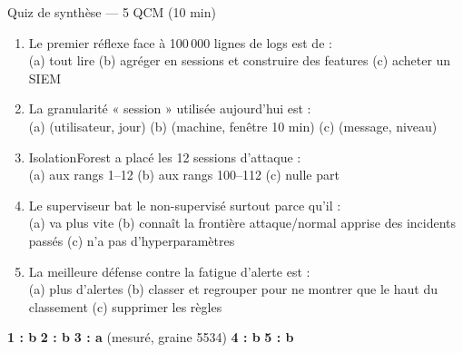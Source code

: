 \begin{frame}{Quiz de synthèse --- 5 QCM (10 min)}
\begin{qbox}
\begin{enumerate}
\item Le premier réflexe face à 100\,000 lignes de logs est de :\\
(a) tout lire \quad (b) agréger en sessions et construire des features \quad
(c) acheter un SIEM
\item La granularité « session » utilisée aujourd'hui est :\\
(a) (utilisateur, jour) \quad (b) (machine, fenêtre 10 min) \quad (c) (message, niveau)
\item IsolationForest a placé les 12 sessions d'attaque :\\
(a) aux rangs 1--12 \quad (b) aux rangs 100--112 \quad (c) nulle part
\item Le superviseur bat le non-supervisé surtout parce qu'il :\\
(a) va plus vite \quad (b) connaît la frontière attaque/normal apprise des
incidents passés \quad (c) n'a pas d'hyperparamètres
\item La meilleure défense contre la fatigue d'alerte est :\\
(a) plus d'alertes \quad (b) classer et regrouper pour ne montrer que le
haut du classement \quad (c) supprimer les règles
\end{enumerate}
\end{qbox}
\vspace{1mm}
\begin{solbox}[Corrigé]
\textbf{1 : b} \quad \textbf{2 : b} \quad \textbf{3 : a} (mesuré, graine 5534) \quad
\textbf{4 : b} \quad \textbf{5 : b}
\end{solbox}
\end{frame}

